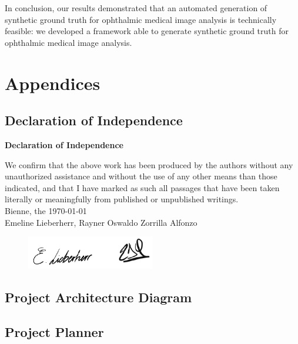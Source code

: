 \documentclass[12pt,a4paper]{scrartcl}
\begin{document}
In conclusion, our results demonstrated that an automated generation of synthetic ground truth for ophthalmic medical image analysis is technically feasible: we developed a framework able to generate synthetic ground truth for ophthalmic medical image analysis.

\markboth{}{}

\newpage




\newpage

\appendix
\section{Appendices}
\renewcommand{\thesubsection}{\Alph{subsection}}
\subsection{Declaration of Independence}
\newpage
\markboth{}{}
  \normalsize
\begin{center}
\huge{\textbf{ Declaration of Independence}}\\[40mm]
\end{center}
\large
We confirm that the above work has been produced by the authors without any unauthorized assistance and without the use of any other means than those indicated, and that I have marked as such all passages that have been taken literally or meaningfully from published or unpublished writings.\\[30mm]
Bienne, the \today \\[10mm]
Emeline Lieberherr, Rayner Oswaldo Zorrilla Alfonzo
\begin{figure}[H]
    \includegraphics[width=0.5\textwidth]{./images/signatures.png}
\end{figure}
\newpage
\subsection{Project Architecture Diagram}


\newpage
\subsection{Project Planner}

\end{document}
